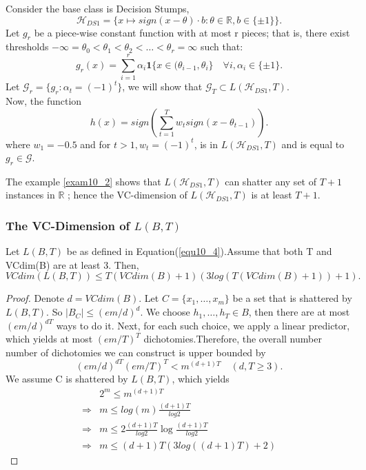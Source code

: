 \begin{exam}
	\label{exam10_2}
	Consider the base class is Decision Stumps,
	\[
		\mathcal{H}_{DS1}=\{ x\mapsto sign(x-\theta) \cdot b : \theta \in \mathbb{R}, b\in \{ \pm 1 \}  \} 
	.\]
	Let $g_r$ be a piece-wise constant function with at most r pieces; that is, there
	exist thresholds $-\infty = \theta_0 < \theta_1 < \theta_2 < \dots < \theta_r = \infty$
	such that:
	 \[
		 g_r(x) = \sum\limits^r_{i=1}\alpha_i \textbf{1} \{ x \in (\theta_{i-1}, \theta_i \} 
		 \quad \forall i, \alpha_i \in \{ \pm 1 \} 
	.\]
	Let $\mathcal{G}_r = \{ g_r : \alpha_t = (-1)^t \} $, we will show that
	$\mathcal{G}_T \subset L(\mathcal{H}_{DS1},T)$.\\
	Now, the function
	\[
		h(x) = sign \left( \sum\limits^T_{t=1} w_t sign(x - \theta_{t-1}) \right)
	.\]
	where $w_1 = -0.5$ and for $t > 1, w_t = (-1)^t$, is in $L(\mathcal{H}_{DS1}, T)$ and
	is equal to $g_r \in \mathcal{G}$.
\end{exam}
The example \ref{exam10_2} shows that $L(\mathcal{H}_{DS1},T)$ can shatter any set of $T+1$ 
instances in $\mathbb{R}$ ; hence the VC-dimension of $L(\mathcal{H}_{DS1},T)$ is at least
$T+1$.

\subsubsection{The VC-Dimension of $L(B,T)$ }

\begin{lem}
	Let $L(B,T)$ be as defined in Equation(\ref{equ10_4}).Assume that both T and
	VCdim(B) are at least 3. Then,
	\[
		VCdim(L(B,T)) \le T(VCdim(B) + 1) (3log(T(VCdim(B)+1)) + 1)
	.\]
\end{lem}
\begin{proof}
	Denote $d = VCdim(B)$. Let $C = \{ x_1, \dots, x_m \} $ be a set that is shattered by
	$L(B,T)$. So $|B_C| \le (em/d)^d$. We choose $h_1,\dots, h_T \in B$, then there are
	at most $(em/d)^{dT}$ ways to do it. Next, for each such choice, we apply a linear
	predictor, which yields at most $(em/T)^T$ dichotomies.Therefore, the overall number
	number of dichotomies we can construct is upper bounded by
	\[
		(em/d)^{dT} (em/T)^T < m^{(d+1)T} \quad (d,T \ge 3)
	.\]
	We assume C is shattered by $L(B,T)$, which yields
	\begin{align*}
		& 2^m \le m^{(d+1)T}\\
		\Rightarrow& m \le log(m) \frac{(d+1)T}{log2}\\
		\Rightarrow& m \le 2 \frac{(d+1)T}{log2} \log \frac{(d+1)T}{log2}\\
		\Rightarrow& m \le (d+1)T(3log((d+1)T) + 2)
	\end{align*}
\end{proof}

